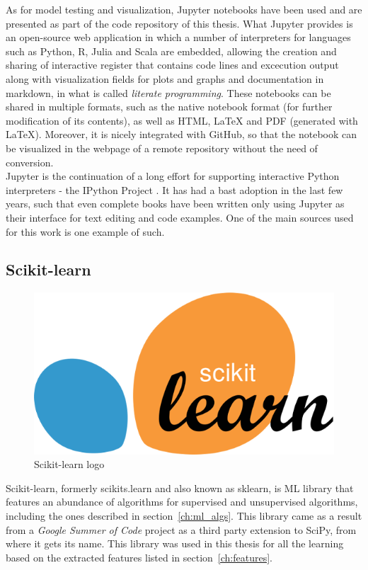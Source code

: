 As for model testing and visualization, Jupyter notebooks \cite{Jupyter} have been used and are presented as part of the code repository of this thesis. What Jupyter provides is an open-source web application in which a number of interpreters for languages such as Python, R, Julia and Scala are embedded, allowing the creation and sharing of interactive register that contains code lines and excecution output along with visualization fields for plots and graphs and documentation in markdown, in what is called \emph{literate programming}. These notebooks can be shared in multiple formats, such as the native notebook format (for further modification of its contents), as well as HTML, \LaTeX{} and PDF (generated with \LaTeX). Moreover, it is nicely integrated with GitHub, so that the notebook can be visualized in the webpage of a remote repository without the need of conversion.\\

Jupyter is the continuation of a long effort for supporting interactive Python interpreters - the IPython Project \cite{IPython}. It has had a bast adoption in the last few years, such that even complete books have been written only using Jupyter as their interface for text editing and code examples. One of the main sources used for this work \cite{Andreas} is one example of such.

\subsection{Scikit-learn}
\begin{figure}[!ht]
    \centering
    \includegraphics[width=0.4\linewidth]{figures/sklearn_logo}
    \caption{Scikit-learn logo}
    \label{fig:sklearn_logo}
\end{figure}
Scikit-learn, formerly scikits.learn and also known as sklearn, is \ac{ML} library that features an abundance of algorithms for supervised and unsupervised algorithms, including the ones described in section~\ref{ch:ml_algs}. This library came as a result from a \emph{Google Summer of Code} project as a third party extension to SciPy, from where it gets its name. This library was used in this thesis for all the learning based on the extracted features listed in section~\ref{ch:features}.

